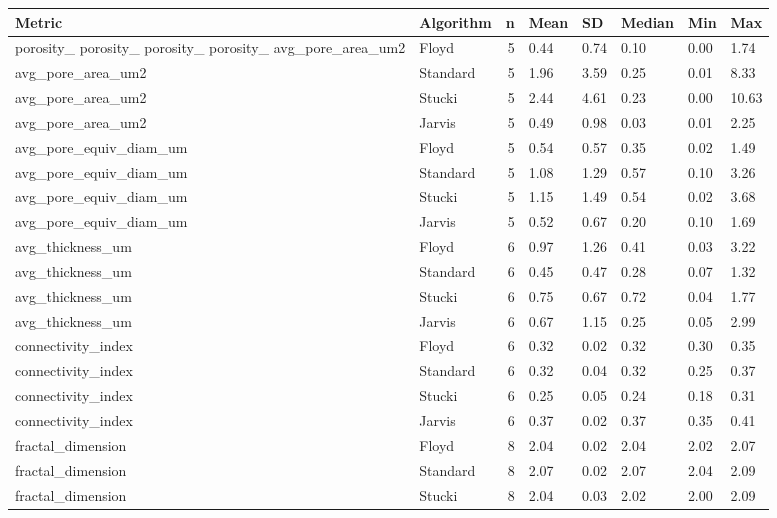 \begin{tabular}{llrlllll}
\toprule
Metric & Algorithm & n & Mean & SD & Median & Min & Max \\
\midrule
porosity_%
porosity_%
porosity_%
porosity_%
avg_pore_area_um2 & Floyd & 5 & 0.44 & 0.74 & 0.10 & 0.00 & 1.74 \\
avg_pore_area_um2 & Standard & 5 & 1.96 & 3.59 & 0.25 & 0.01 & 8.33 \\
avg_pore_area_um2 & Stucki & 5 & 2.44 & 4.61 & 0.23 & 0.00 & 10.63 \\
avg_pore_area_um2 & Jarvis & 5 & 0.49 & 0.98 & 0.03 & 0.01 & 2.25 \\
avg_pore_equiv_diam_um & Floyd & 5 & 0.54 & 0.57 & 0.35 & 0.02 & 1.49 \\
avg_pore_equiv_diam_um & Standard & 5 & 1.08 & 1.29 & 0.57 & 0.10 & 3.26 \\
avg_pore_equiv_diam_um & Stucki & 5 & 1.15 & 1.49 & 0.54 & 0.02 & 3.68 \\
avg_pore_equiv_diam_um & Jarvis & 5 & 0.52 & 0.67 & 0.20 & 0.10 & 1.69 \\
avg_thickness_um & Floyd & 6 & 0.97 & 1.26 & 0.41 & 0.03 & 3.22 \\
avg_thickness_um & Standard & 6 & 0.45 & 0.47 & 0.28 & 0.07 & 1.32 \\
avg_thickness_um & Stucki & 6 & 0.75 & 0.67 & 0.72 & 0.04 & 1.77 \\
avg_thickness_um & Jarvis & 6 & 0.67 & 1.15 & 0.25 & 0.05 & 2.99 \\
connectivity_index & Floyd & 6 & 0.32 & 0.02 & 0.32 & 0.30 & 0.35 \\
connectivity_index & Standard & 6 & 0.32 & 0.04 & 0.32 & 0.25 & 0.37 \\
connectivity_index & Stucki & 6 & 0.25 & 0.05 & 0.24 & 0.18 & 0.31 \\
connectivity_index & Jarvis & 6 & 0.37 & 0.02 & 0.37 & 0.35 & 0.41 \\
fractal_dimension & Floyd & 8 & 2.04 & 0.02 & 2.04 & 2.02 & 2.07 \\
fractal_dimension & Standard & 8 & 2.07 & 0.02 & 2.07 & 2.04 & 2.09 \\
fractal_dimension & Stucki & 8 & 2.04 & 0.03 & 2.02 & 2.00 & 2.09 \\

\end{tabular}
